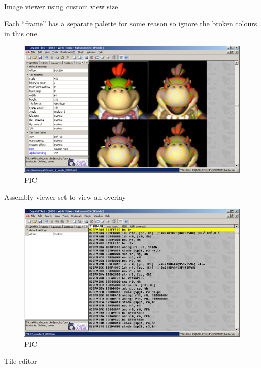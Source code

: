 \documentclass[
]{book}
\begin{document}
Image viewer using custom view size

Each ``frame'' has a separate palette for some reason so ignore the broken colours in this one.

\begin{figure}
\centering
\includegraphics{images/223_home_fast6191_romhackingguide_unrenamed_fil___inal_borders_romhackguidecrystaltile2usage4.png}
\caption{PIC}
\end{figure}

Assembly viewer set to view an overlay

\begin{figure}
\centering
\includegraphics{images/224_home_fast6191_romhackingguide_unrenamed_fil___inal_borders_romhackguidecrystaltile2usage5.png}
\caption{PIC}
\end{figure}

Tile editor
\end{document}

